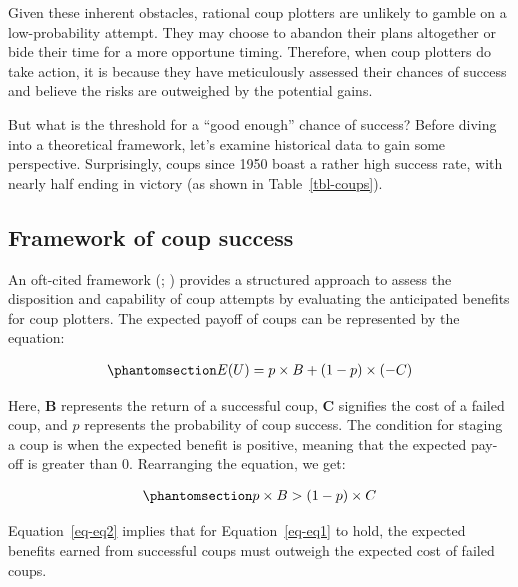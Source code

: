 \documentclass[
  12pt,
]{report}
\begin{document}
Given these inherent obstacles, rational coup plotters are unlikely to
gamble on a low-probability attempt. They may choose to abandon their
plans altogether or bide their time for a more opportune timing.
Therefore, when coup plotters do take action, it is because they have
meticulously assessed their chances of success and believe the risks are
outweighed by the potential gains.

But what is the threshold for a ``good enough'' chance of success?
Before diving into a theoretical framework, let's examine historical
data to gain some perspective. Surprisingly, coups since 1950 boast a
rather high success rate, with nearly half ending in victory (as shown
in Table~\ref{tbl-coups}).

\subsection{Framework of coup success}\label{framework-of-coup-success}

An oft-cited framework (; ) provides a
structured approach to assess the disposition and capability of coup
attempts by evaluating the anticipated benefits for coup plotters. The
expected payoff of coups can be represented by the equation:

\begin{equation}\phantomsection\label{eq-eq1}{
\begin{aligned}
E(U) = p \times B + (1 - p) \times (-C)
\end{aligned}
}\end{equation}

Here, \(\mathbf B\) represents the return of a successful coup,
\(\mathbf C\) signifies the cost of a failed coup, and \(p\) represents
the probability of coup success. The condition for staging a coup is
when the expected benefit is positive, meaning that the expected pay-off
is greater than 0. Rearranging the equation, we get:

\begin{equation}\phantomsection\label{eq-eq2}{
\begin{aligned}
p \times B > (1 - p) \times C
\end{aligned}
}\end{equation}

Equation~\ref{eq-eq2} implies that for Equation~\ref{eq-eq1} to hold,
the expected benefits earned from successful coups must outweigh the
expected cost of failed coups.
\end{document}
